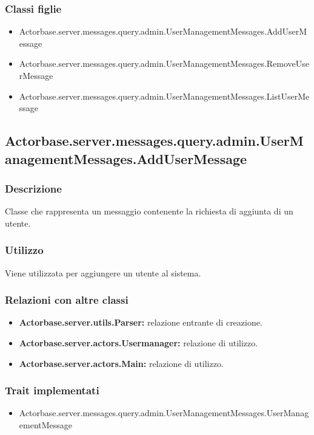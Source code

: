 \documentclass[a4paper]{article}
\begin{document}
			\subsubsection{Classi figlie}
				\begin{itemize}
					\item Actorbase.server.messages.query.admin.UserManagementMessages.AddUserMessage
					\item Actorbase.server.messages.query.admin.UserManagementMessages.RemoveUserMessage
					\item Actorbase.server.messages.query.admin.UserManagementMessages.ListUserMessage
				\end{itemize}
			
		\subsection{Actorbase.server.messages.query.admin.UserManagementMessages.AddUserMessage}
			\subsubsection{Descrizione}
				Classe che rappresenta un messaggio contenente la richiesta di aggiunta di un utente.
				
			\subsubsection{Utilizzo}
				Viene utilizzata per aggiungere un utente al sistema.
				
			\subsubsection{Relazioni con altre classi}
				\begin{itemize}
					\item \textbf{Actorbase.server.utils.Parser:} relazione entrante di creazione.
					\item \textbf{Actorbase.server.actors.Usermanager:} relazione di utilizzo.
					\item \textbf{Actorbase.server.actors.Main:} relazione di utilizzo.
				\end{itemize}
			\subsubsection{Trait implementati}
				\begin{itemize}
					\item Actorbase.server.messages.query.admin.UserManagementMessages.UserManagementMessage
				\end{itemize}
		
\end{document}
